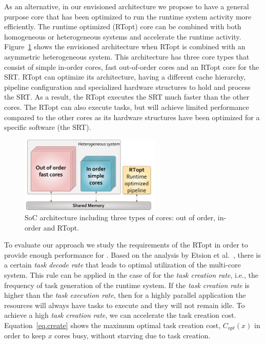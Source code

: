 As an alternative, in our envisioned architecture we propose to have a general purpose core that has been optimized to run the runtime system activity more efficiently. 
The runtime optimized (RTopt) core can be combined with both homogeneous or heterogeneous systems and accelerate the runtime activity.
Figure~\ref{fig:hw} shows the envisioned architecture when RTopt is combined with an asymmetric heterogeneous system.
This architecture has three core types that consist of simple in-order cores, fast out-of-order cores and an RTopt core for the SRT. 
RTopt can optimize its architecture, having a different cache hierarchy, pipeline configuration and specialized hardware structures to hold and process the SRT. 
As a result, the RTopt executes the SRT much faster than the other cores. 
The RTopt can also execute tasks, but will achieve limited performance compared to the other cores as its hardware structures have been optimized for a specific software (the SRT).
\begin{figure}[t!]
	\centering
	\includegraphics[width=0.6\textwidth]{figures/hw_fig.pdf}
	\caption{SoC architecture including three types of cores: out of order, in-order and RTopt.}
	\label{fig:hw}
\end{figure}
To evaluate our approach we study the requirements of the RTopt in order to provide enough performance for {\proposal}.
Based on the analysis by Etsion et al.~\cite{TaskSS}, there is a certain \textit{task decode rate} that leads to optimal utilization of the multi-core system.
This rule can be applied in the case of {\proposal} for the \textit{task creation rate}, i.e., the frequency of task generation of the runtime system.
If the \textit{task creation rate} is higher than the \textit{task execution rate}, then for a highly parallel application the resources will always have tasks to execute and they will not remain idle.
To achieve a high \textit{task creation rate}, we can accelerate the task creation cost.
Equation~\ref{eq.create} shows the maximum optimal task creation cost, $C_{opt}(x)$ in order to keep $x$ cores busy, without starving due to task creation.

